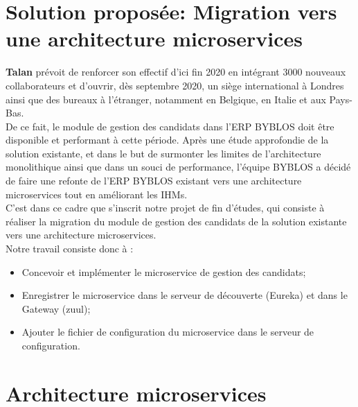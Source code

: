 \section{Solution proposée: Migration vers une architecture microservices}
\textbf{Talan} prévoit de renforcer son effectif d’ici fin 2020 en intégrant 3000 nouveaux collaborateurs et d’ouvrir, dès septembre 2020, un siège international à Londres ainsi que des bureaux à l’étranger, notamment en Belgique, en Italie et aux Pays-Bas.\\
De ce fait, le module de gestion des candidats dans l'ERP BYBLOS doit être disponible et performant à cette période. Après une étude approfondie de la solution existante, et dans le but de surmonter les limites de l'architecture monolithique ainsi que dans un souci de performance, l'équipe BYBLOS a décidé de faire une refonte de l'ERP BYBLOS existant vers une architecture microservices tout en améliorant les IHMs.\\
C'est dans ce cadre que s'inscrit notre projet de fin d'études, qui consiste à réaliser la migration du module de gestion des candidats de la solution existante vers une architecture microservices.\\
Notre travail consiste donc à :
\begin{itemize}
    \item Concevoir et implémenter le microservice de gestion des candidats;
    \item Enregistrer le microservice dans le  serveur de découverte (Eureka) et dans le Gateway (zuul);
    \item Ajouter le fichier de configuration du microservice dans le serveur de configuration.  
\end{itemize}
  
\color{black}
\section{Architecture microservices}

